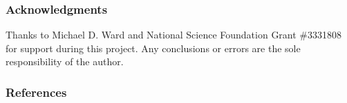 \documentclass[12pt,letterpaper]{article} %
\begin{document}

\subsubsection*{Acknowledgments}

Thanks to Michael D. Ward and National Science Foundation Grant \#3331808 for support during this project. Any conclusions or errors are the sole responsibility of the author.

\subsubsection*{References}



\begingroup
\renewcommand{\section}[2]{}


\endgroup
\end{document}
